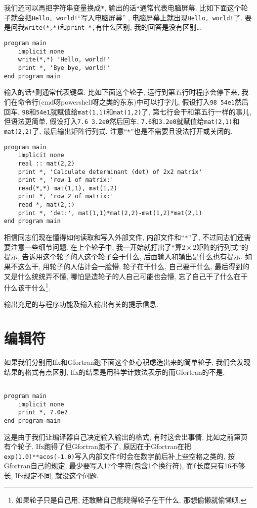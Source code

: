 我们还可以再把字符串变量换成\texttt{*}, 输出的话\texttt{*}通常代表电脑屏幕. 比如下面这个轮子就会把\texttt{Hello, world!}``写入电脑屏幕'' , 电脑屏幕上就出现\texttt{Hello, world!}了. 要是问我\texttt{write(*,*)}和\texttt{print *,}有什么区别, 我的回答是没有区别\dots
\begin{lstlisting}
program main
    implicit none
    write(*,*) 'Hello, world!'
    print *, 'Bye bye, world!'
end program main
\end{lstlisting}
输入的话\texttt{*}则通常代表键盘. 比如下面这个轮子, 运行到第五行时程序会停下来, 我们在命令行(cmd呀powershell呀之类的东东)中可以打字儿, 假设打入\texttt{98 54e1}然后回车, \texttt{98}和\texttt{54e1}就赋值给\texttt{mat(1,1)}和\texttt{mat(1,2)}了, 第七行会干和第五行一样的事儿, 但语法更简单, 假设打入\texttt{7.6 3.2e0}然后回车, \texttt{7.6}和\texttt{3.2e0}就赋值给\texttt{mat(2,1)}和\texttt{mat(2,2)}了, 最后输出矩阵行列式. 注意``\texttt{*}''也是不需要且没法打开或关闭的.
\begin{lstlisting}
program main
    implicit none
    real :: mat(2,2)
    print *, 'Calculate determinant (det) of 2x2 matrix'
    print *, 'row 1 of matrix:'
    read(*,*) mat(1,1), mat(1,2)
    print *, 'row 2 of matrix:'
    read *, mat(2,:)
    print *, 'det:', mat(1,1)*mat(2,2)-mat(1,2)*mat(2,1)
end program main
\end{lstlisting}

相信同志们现在懂得如何读取和写入外部文件, 内部文件和``\texttt{*}''了, 不过同志们还需要注意一些细节问题. 在上个轮子中, 我一开始就打出了``算$2\times2$矩阵的行列式''的提示, 告诉用这个轮子的人这个轮子会干什么, 后面输入和输出是什么也有提示. 如果不这么干, 用轮子的人估计会一脸懵, 轮子在干什么, 自己要干什么, 最后得到的又是什么统统弄不懂, 哪怕是造轮子的人自己可能也会懵, 忘了自己干了什么在干什么该干什么\footnote{如果轮子只是自己用, 还敢赌自己能晓得轮子在干什么, 那想偷懒就偷懒呗.}.

\begin{convention}
    输出充足的与程序功能及输入输出有关的提示信息.
\end{convention}

\section{编辑符}\label{fortran_edit_descriptor}

如果我们分别用Ifx和Gfortran跑下面这个处心积虑造出来的简单轮子, 我们会发现结果的格式有点区别, Ifx的结果是用科学计数法表示的而Gfortran的不是.
\begin{lstlisting}

program main
    implicit none
    print *, 7.0e7
end program main
\end{lstlisting}
这是由于我们让编译器自己决定输入输出的格式, 有时这会出事情, 比如之前第\pageref{internal_file}页有个轮子, Ifx跑得了但Gfortran跑不了, 原因在于Gfortran在把\texttt{exp(1.0)**acos(-1.0)}写入内部文件\texttt{f}时会在数字前后补上些空格之类的, 按Gfortran自己的规定, 最少要写入17个字符(包含1个换行符), 而\texttt{f}长度只有16不够长, Ifx规定不同, 就没这个问题.

